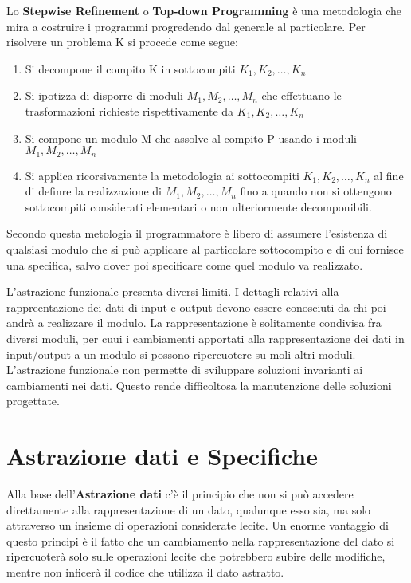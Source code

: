 \documentclass[a4paper,18pt]{extarticle}
\begin{document}
Lo \textbf{Stepwise Refinement} o \textbf{Top-down Programming} è una metodologia che mira a costruire i programmi progredendo dal generale al particolare. Per risolvere un problema K si procede come segue:
\begin{enumerate}
    \item Si decompone il compito K in sottocompiti $K_1, K_2, \dots, K_n$
    \item Si ipotizza di disporre di moduli $M_1, M_2, \dots, M_n$ che effettuano le trasformazioni richieste rispettivamente da $K_1, K_2, \dots, K_n$
    \item Si compone un modulo M che assolve al compito P usando i moduli $M_1, M_2, \dots, M_n$
    \item Si applica ricorsivamente la metodologia ai sottocompiti $K_1, K_2, \dots, K_n$ al fine di definre la realizzazione di $M_1, M_2, \dots, M_n$ fino a quando non si ottengono sottocompiti considerati elementari o non ulteriormente decomponibili.
\end{enumerate}

Secondo questa metologia il programmatore è libero di assumere l'esistenza di qualsiasi modulo che si può applicare al particolare sottocompito e di cui fornisce una specifica, salvo dover poi specificare come quel modulo va realizzato.

L'astrazione funzionale presenta diversi limiti. I dettagli relativi alla rappreentazione dei dati di input e output devono essere conosciuti da chi poi andrà a realizzare il modulo. La rappresentazione è solitamente condivisa fra diversi moduli, per cuui i cambiamenti apportati alla rappresentazione dei dati in input/output a un modulo si possono ripercuotere su moli altri moduli. L'astrazione funzionale non permette di sviluppare soluzioni invarianti ai cambiamenti nei dati. Questo rende difficoltosa la manutenzione delle soluzioni progettate.

\newpage

\section{ Astrazione dati e Specifiche}

Alla base dell'\textbf{Astrazione dati} c'è il principio che non si può accedere direttamente alla rappresentazione di un dato, qualunque esso sia, ma solo attraverso un insieme di operazioni considerate lecite. Un enorme vantaggio di questo principi è il fatto che un cambiamento nella rappresentazione del dato si ripercuoterà solo sulle operazioni lecite che potrebbero subire delle modifiche, mentre non inficerà il codice che utilizza il dato astratto.
\end{document}
